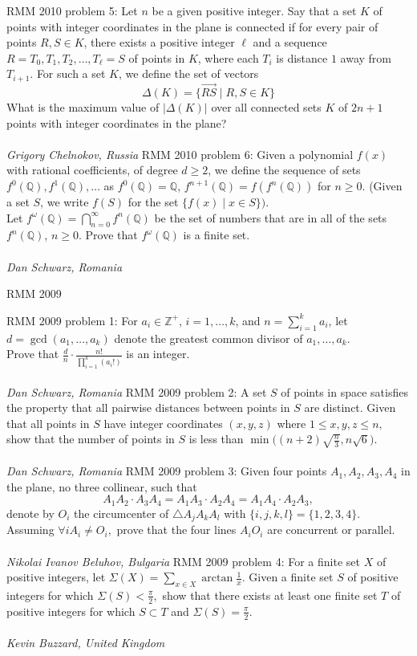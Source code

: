RMM 2010 problem 5:  Let $n$ be a given positive integer. Say that a set $K$ of points with integer coordinates in the plane is connected if for every pair of points $R, S\in K$, there exists a positive integer $\ell$ and a sequence $R=T_0,T_1, T_2,\ldots ,T_{\ell}=S$ of points in $K$, where each $T_i$ is distance $1$ away from $T_{i+1}$. For such a set $K$, we define the set of vectors
\[ \Delta(K)=\{\overrightarrow{RS}\mid R, S\in K\} \]
What is the maximum value of $|\Delta(K)|$ over all connected sets $K$ of $2n+1$ points with integer coordinates in the plane? \\\\
\textit{Grigory Chelnokov, Russia} 
RMM 2010 problem 6:  Given a polynomial $f(x)$ with rational coefficients, of degree $d \ge 2$, we define the sequence of sets $f^0(\mathbb{Q}), f^1(\mathbb{Q}), \ldots$ as $f^0(\mathbb{Q})=\mathbb{Q}$, $f^{n+1}(\mathbb{Q})=f(f^n(\mathbb{Q}))$ for $n\ge 0$. (Given a set $S$, we write $f(S)$ for the set $\{f(x)\mid x\in S\})$. \\
Let $f^{\omega}(\mathbb{Q})=\bigcap_{n=0}^{\infty} f^n(\mathbb{Q})$ be the set of numbers that are in all of the sets $f^n(\mathbb{Q})$, $n\geq 0$. Prove that $f^{\omega}(\mathbb{Q})$ is a finite set. \\\\
\textit{Dan Schwarz, Romania} 

RMM 2009 

RMM 2009 problem 1:  For $ a_i \in \mathbb{Z}^ +$, $ i = 1, \ldots, k$, and $ n = \sum^k_{i = 1} a_i$, let $ d = \gcd(a_1, \ldots, a_k)$ denote the greatest common divisor of $ a_1, \ldots, a_k$. \\
Prove that $ \frac {d} {n} \cdot \frac {n!}{\prod\limits^k_{i = 1} (a_i!)}$ is an integer. \\\\
\textit{Dan Schwarz, Romania} 
RMM 2009 problem 2:  A set $ S$ of points in space satisfies the property that all pairwise distances between points in $ S$ are distinct. Given that all points in $ S$ have integer coordinates $ (x,y,z)$ where $ 1 \leq x,y, z \leq n,$ show that the number of points in $ S$ is less than $ \min \Big((n + 2)\sqrt {\frac {n}{3}}, n \sqrt {6}\Big).$ \\\\
\textit{Dan Schwarz, Romania} 
RMM 2009 problem 3:  Given four points $ A_1, A_2, A_3, A_4$ in the plane, no three collinear, such that
\[ A_1A_2 \cdot A_3 A_4 = A_1 A_3 \cdot A_2 A_4 = A_1 A_4 \cdot A_2 A_3, \]
denote by $ O_i$ the circumcenter of $ \triangle A_j A_k A_l$ with $ \{i,j,k,l\} = \{1,2,3,4\}.$ Assuming $ \forall i A_i \neq O_i ,$ prove that the four lines $ A_iO_i$ are concurrent or parallel. \\\\
\textit{Nikolai Ivanov Beluhov, Bulgaria} 
RMM 2009 problem 4:  For a finite set $ X$ of positive integers, let $ \Sigma(X) = \sum_{x \in X} \arctan \frac{1}{x}.$ Given a finite set $ S$ of positive integers for which $ \Sigma(S) < \frac{\pi}{2},$ show that there exists at least one finite set $ T$ of positive integers for which $ S \subset T$ and $ \Sigma(S) = \frac{\pi}{2}.$ \\\\
\textit{Kevin Buzzard, United Kingdom} 

